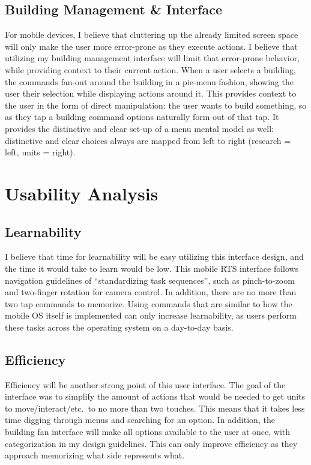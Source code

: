 \documentclass[11pt]{article}
\begin{document}
	\subsection{Building Management \& Interface}
	For mobile devices, I believe that cluttering up the already limited screen space will only make the user more error-prone as they execute actions. I believe that utilizing my building management interface will limit that error-prone behavior, while providing context to their current action. When a user selects a building, the commands fan-out around the building in a pie-menu fashion, showing the user their selection while displaying actions around it. This provides context to the user in the form of direct manipulation: the user wants to build something, so as they tap a building command options naturally form out of that tap. It provides the distinctive and clear set-up of a menu mental model as well: distinctive and clear choices always are mapped from left to right (research = left, units = right). 
\section{Usability Analysis}
	\subsection{Learnability}
	I believe that time for learnability will be easy utilizing this interface design, and the time it would take to learn would be low. This mobile RTS interface follows navigation guidelines of ``standardizing task sequences'', such as pinch-to-zoom and two-finger rotation for camera control. In addition, there are no more than two tap commands to memorize. Using commands that are similar to how the mobile OS itself is implemented can only increase learnability, as users perform these tasks across the operating system on a day-to-day basis.
	\subsection{Efficiency}
	Efficiency will be another strong point of this user interface. The goal of the interface was to simplify the amount of actions that would be needed to get units to move/interact/etc.\ to no more than two touches. This means that it takes less time digging through menus and searching for an option. In addition, the building fan interface will make all options available to the user at once, with categorization in my design guidelines. This can only improve efficiency as they approach memorizing what side represents what.
\end{document}
